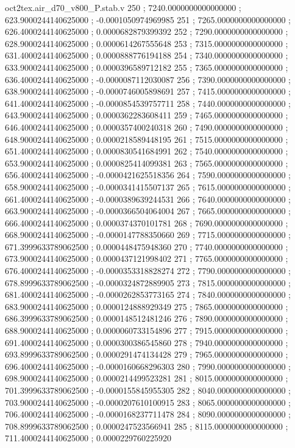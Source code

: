 \begin{filecontents}[overwrite]{oct2tex.air_d70_v800_P.stab.v}
250 ; 7240.0000000000000000 ; 623.9000244140625000 ; -0.0001050974969985
251 ; 7265.0000000000000000 ; 626.4000244140625000 ; 0.0000682879399392
252 ; 7290.0000000000000000 ; 628.9000244140625000 ; 0.0000614267555648
253 ; 7315.0000000000000000 ; 631.4000244140625000 ; 0.0000888776194188
254 ; 7340.0000000000000000 ; 633.9000244140625000 ; 0.0000396589712182
255 ; 7365.0000000000000000 ; 636.4000244140625000 ; -0.0000087112030087
256 ; 7390.0000000000000000 ; 638.9000244140625000 ; -0.0000746005898691
257 ; 7415.0000000000000000 ; 641.4000244140625000 ; -0.0000854539757711
258 ; 7440.0000000000000000 ; 643.9000244140625000 ; 0.0000362283608411
259 ; 7465.0000000000000000 ; 646.4000244140625000 ; 0.0000357400240318
260 ; 7490.0000000000000000 ; 648.9000244140625000 ; 0.0000218589448195
261 ; 7515.0000000000000000 ; 651.4000244140625000 ; 0.0000830541684991
262 ; 7540.0000000000000000 ; 653.9000244140625000 ; 0.0000825414099381
263 ; 7565.0000000000000000 ; 656.4000244140625000 ; -0.0000421625518356
264 ; 7590.0000000000000000 ; 658.9000244140625000 ; -0.0000341415507137
265 ; 7615.0000000000000000 ; 661.4000244140625000 ; -0.0000389639244531
266 ; 7640.0000000000000000 ; 663.9000244140625000 ; -0.0000366504064004
267 ; 7665.0000000000000000 ; 666.4000244140625000 ; 0.0000374370101781
268 ; 7690.0000000000000000 ; 668.9000244140625000 ; -0.0000147788350660
269 ; 7715.0000000000000000 ; 671.3999633789062500 ; 0.0000448475948360
270 ; 7740.0000000000000000 ; 673.9000244140625000 ; 0.0000437121998402
271 ; 7765.0000000000000000 ; 676.4000244140625000 ; -0.0000353318828274
272 ; 7790.0000000000000000 ; 678.8999633789062500 ; -0.0000324872889905
273 ; 7815.0000000000000000 ; 681.4000244140625000 ; -0.0000262853773165
274 ; 7840.0000000000000000 ; 683.9000244140625000 ; 0.0000124888929349
275 ; 7865.0000000000000000 ; 686.3999633789062500 ; 0.0000148512481246
276 ; 7890.0000000000000000 ; 688.9000244140625000 ; 0.0000060733154896
277 ; 7915.0000000000000000 ; 691.4000244140625000 ; 0.0000300386545860
278 ; 7940.0000000000000000 ; 693.8999633789062500 ; 0.0000291474134428
279 ; 7965.0000000000000000 ; 696.4000244140625000 ; -0.0000160668296303
280 ; 7990.0000000000000000 ; 698.9000244140625000 ; 0.0000214499523281
281 ; 8015.0000000000000000 ; 701.3999633789062500 ; -0.0000155845955305
282 ; 8040.0000000000000000 ; 703.9000244140625000 ; -0.0000207610100915
283 ; 8065.0000000000000000 ; 706.4000244140625000 ; -0.0000168237711478
284 ; 8090.0000000000000000 ; 708.8999633789062500 ; 0.0000247523566941
285 ; 8115.0000000000000000 ; 711.4000244140625000 ; 0.0000229760225920

\end{filecontents}
